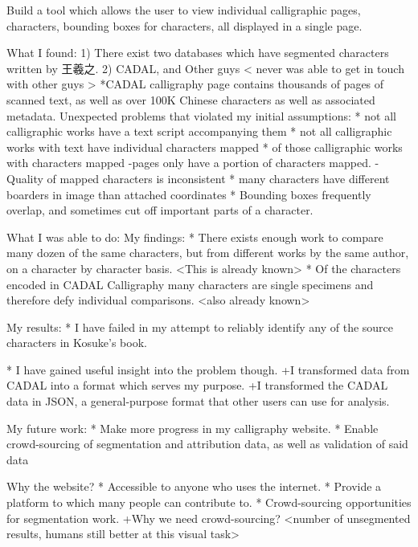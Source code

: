         Build a tool which allows the user to view individual calligraphic pages, characters, bounding boxes for characters, all displayed in a single page.
    
What I found:
    1)  There exist two databases which have segmented characters written by 王羲之.
    2)  CADAL, and Other guys < never was able to get in touch with other guys >
        *CADAL calligraphy page contains thousands of pages of scanned text, as well as over 100K Chinese characters as well as associated metadata.
    Unexpected problems that violated my initial assumptions:
        * not all calligraphic works have a text script accompanying them
        * not all calligraphic works with text have individual characters mapped
        * of those calligraphic works with characters mapped
            -pages only have a portion of characters mapped.
            -Quality of mapped characters is inconsistent
                * many characters have different boarders in image than attached coordinates
                * Bounding boxes frequently overlap, and sometimes cut off important parts of a character.

What I was able to do:
    My findings:
        * There exists enough work to compare many dozen of the same characters, but from different works by the same author, on a character by character basis. <This is already known>
        *  Of the characters encoded in CADAL Calligraphy many characters are single specimens and therefore defy individual comparisons.  <also already known>
    
    My results:
        *  I have failed in my attempt to reliably identify any of the source characters in Kosuke's book.
        
        *  I have gained useful insight into the problem though.
            +I transformed data from CADAL into a format which serves my purpose.
            +I transformed the CADAL data in JSON, a general-purpose format that other users can use for analysis.
            
    My future work:
        *  Make more progress in my calligraphy website.
        *  Enable crowd-sourcing of segmentation and attribution data, as well as validation of said data


Why the website?
    * Accessible to anyone who uses the internet.
    * Provide  a platform to which many people can contribute to.
    * Crowd-sourcing opportunities for segmentation work.
        +Why we need crowd-sourcing? <number of unsegmented results, humans still better at this visual task>


